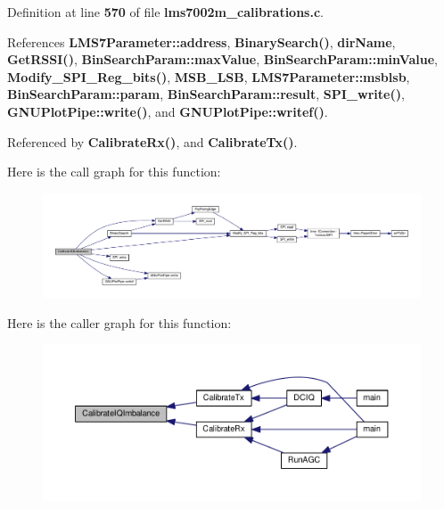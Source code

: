 Definition at line {\bf 570} of file {\bf lms7002m\+\_\+calibrations.\+c}.



References {\bf L\+M\+S7\+Parameter\+::address}, {\bf Binary\+Search()}, {\bf dir\+Name}, {\bf Get\+R\+S\+S\+I()}, {\bf Bin\+Search\+Param\+::max\+Value}, {\bf Bin\+Search\+Param\+::min\+Value}, {\bf Modify\+\_\+\+S\+P\+I\+\_\+\+Reg\+\_\+bits()}, {\bf M\+S\+B\+\_\+\+L\+SB}, {\bf L\+M\+S7\+Parameter\+::msblsb}, {\bf Bin\+Search\+Param\+::param}, {\bf Bin\+Search\+Param\+::result}, {\bf S\+P\+I\+\_\+write()}, {\bf G\+N\+U\+Plot\+Pipe\+::write()}, and {\bf G\+N\+U\+Plot\+Pipe\+::writef()}.



Referenced by {\bf Calibrate\+Rx()}, and {\bf Calibrate\+Tx()}.



Here is the call graph for this function\+:
\nopagebreak
\begin{figure}[H]
\begin{center}
\leavevmode
\includegraphics[width=350pt]{d3/dec/lms7002m__calibrations_8c_a6af7d7b5195308346d2ceeba3a7958e4_cgraph}
\end{center}
\end{figure}




Here is the caller graph for this function\+:
\nopagebreak
\begin{figure}[H]
\begin{center}
\leavevmode
\includegraphics[width=350pt]{d3/dec/lms7002m__calibrations_8c_a6af7d7b5195308346d2ceeba3a7958e4_icgraph}
\end{center}
\end{figure}


